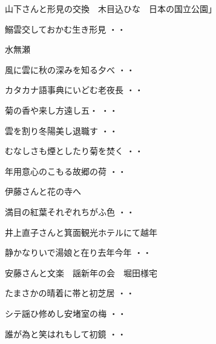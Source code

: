 \vspace{ 0.4cm}
山下さんと形見の交換　木目込ひな　日本の国立公園」
\begin{shiika}鰯雲交しておかむ生き形見
\hfill{・・}\end{shiika}
\vspace{ 0.4cm}
水無瀬
\begin{shiika}風に雲に秋の深みを知る夕べ
\hfill{・・}\end{shiika}
\begin{shiika}カタカナ語事典にいどむ老夜長
\hfill{・・}\end{shiika}
\begin{shiika}菊の香や来し方遠し五・
\hfill{・・}\end{shiika}
\begin{shiika}雲を割り冬陽美し退職す
\hfill{・・}\end{shiika}
\begin{shiika}むなしさも煙としたり菊を焚く
\hfill{・・}\end{shiika}
\begin{shiika}年用意心のこもる故郷の荷
\hfill{・・}\end{shiika}
\vspace{ 0.4cm}
伊藤さんと花の寺へ
\begin{shiika}満目の紅葉それぞれちがふ色
\hfill{・・}\end{shiika}
\vspace{ 0.4cm}
井上直子さんと箕面観光ホテルにて越年
\begin{shiika}静かなりいで湯娘と在り去年今年
\hfill{・・}\end{shiika}
\vspace{ 0.4cm}
安藤さんと文楽　謡新年の会　堀田様宅
\begin{shiika}たまさかの晴着に帯と初芝居
\hfill{・・}\end{shiika}
\begin{shiika}シテ謡ひ修めし安堵室の梅
\hfill{・・}\end{shiika}
\begin{shiika}誰が為と笑はれもして初鏡
\hfill{・・}\end{shiika}
